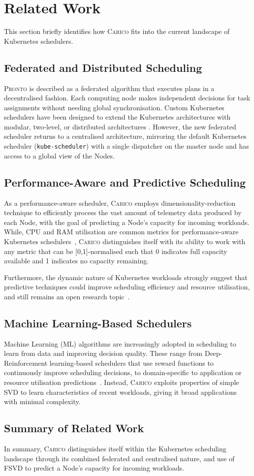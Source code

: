 \section{Related Work}
This section briefly identifies how \textsc{Carico} fits into the current
landscape of Kubernetes schedulers.

\subsection{Federated and Distributed Scheduling}
\textsc{Pronto} is described as a federated algorithm that executes plans in a
decentralised fashion. Each computing node makes independent decisions for task
assignments without needing global synchronisation. Custom Kubernetes schedulers
have been designed to extend the Kubernetes architectures with modular,
two-level, or distributed architectures \cite{beltre2019kubesphere, casquero2019distributed, luong2019multi, zhang2019multi}. However, the new
federated scheduler returns to a centralised architecture, mirroring the default
Kubernetes scheduler (\texttt{kube-scheduler}) with a single dispatcher on the
master node and has access to a global view of the Nodes.

\subsection{Performance-Aware and Predictive Scheduling}
As a performance-aware scheduler, \textsc{Carico} employs
dimensionality-reduction technique to efficiently process the vast amount of
telemetry data produced by each Node, with the goal of predicting a Node's
capacity for incoming workloads. While, CPU and RAM utilisation are common
metrics for performance-aware Kubernetes schedulers~\cite{bao2019deep,
beltre2019kubesphere, bestari2020dynamic, carvalho2021qoe, toka2021ultra},
\textsc{Carico} distinguishes itself with its ability to work with any metric
that can be [0,1]-normalised such that 0 indicates full capacity available and 1
indicates no capacity remaining.

Furthermore, the dynamic nature of Kubernetes workloads strongly suggest that
predictive techniques could improve scheduling efficiency and resource
utilisation, and still remains an open research
topic~\cite{carrion2022kubernetes}.

\subsection{Machine Learning-Based Schedulers}
Machine Learning (ML) algorithms  are increasingly adopted in scheduling to
learn from data and improving decision quality. These range from
Deep-Reinforcement learning-based schedulers \cite{bao2019deep, huang2020rlsk,
peng2021dl2, han2021tailored} that use reward functions to continuously improve
scheduling decisions, to domain-specific to application or resource utilisation
predictions~\cite{yang2019design, carvalho2021qoe, harichane2020proposal}.
Instead, \textsc{Carico} exploits properties of simple SVD to learn
characteristics of recent workloads, giving it broad applications with minimal
complexity.

\subsection{Summary of Related Work}
In summary, \textsc{Carico} distinguishes itself within the Kubernetes
scheduling landscape through its combined federated and centralised nature, and
use of FSVD to predict a Node's capacity for incoming workloads.
